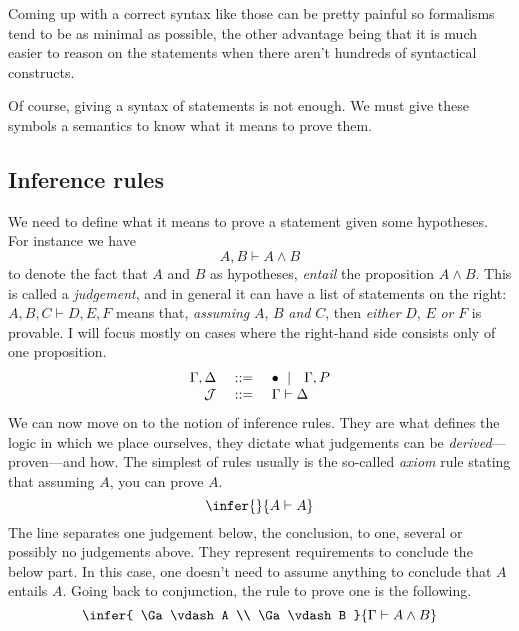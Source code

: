 Coming up with a correct syntax like those can be pretty painful so formalisms
tend to be as minimal as possible, the other advantage being that it is much
easier to reason on the statements when there aren't hundreds of syntactical
constructs.

Of course, giving a syntax of statements is not enough. We must give these
symbols a semantics to know what it means to prove them.

\subsection{Inference rules}

We need to define what it means to prove a statement given some hypotheses.
For instance we have
\[
  A, B \vdash A \wedge B
\]
to denote the fact that \(A\) and \(B\) as hypotheses, \emph{entail} the
proposition \(A \wedge B\).
This is called a \emph{judgement}, and in general it can have a list of
statements on the right: \(A, B, C \vdash D, E, F\) means that, \emph{assuming}
\(A\), \(B\) \emph{and} \(C\), then \emph{either} \(D\), \(E\) \emph{or} \(F\)
is provable.
I will focus mostly on cases where the right-hand side consists only
of one proposition.
\[
  \begin{array}{rcl}
    \Gamma, \Delta &\ \mathrel{{:}{:}{=}}\ & \bullet \ \mid\ \  \Gamma, P \\
    \mathcal{J} &\ \mathrel{{:}{:}{=}}\ & \Gamma \vdash \Delta
  \end{array}
\]
We can now move on to the notion of inference rules. They are what defines the
logic in which we place ourselves, they dictate what judgements can be
\emph{derived}---\ie proven---and how.
The simplest of rules usually is the so-called \emph{axiom} rule stating that
assuming \(A\), you can prove \(A\).
\[
  \infer
    { }
    {A \vdash A}
\]
The line separates one judgement below, the conclusion, to one, several or
possibly no judgements above. They represent requirements to conclude the below
part. In this case, one doesn't need to assume anything to conclude that \(A\)
entails \(A\).
Going back to conjunction, the rule to prove one is the following.
\[
  \infer
    {
      \Ga \vdash A \\
      \Ga \vdash B
    }
    {\Ga \vdash A \wedge B}
\]
